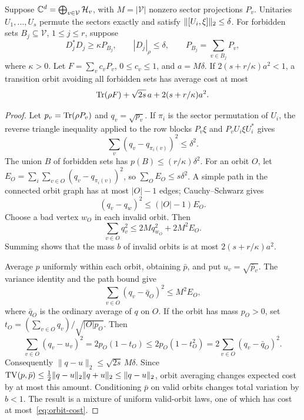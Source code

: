 \begin{theorem}\label{thm:reset-obstruction}
Suppose $\mathbb C^d=\bigoplus_{v\in\mathcal V}\mathcal H_v$, with $M=|\mathcal V|$ nonzero sector projections $P_v$. Unitaries $U_1,\ldots,U_s$ permute the sectors exactly and satisfy $\lVert[U_i,\xi]\rVert_2\le\delta$. For forbidden sets $B_j\subseteq\mathcal V$, $1\le j\le r$, suppose
\[
 D_j^*D_j\ge\kappa P_{B_j},\qquad |D_j|_\rho\le\delta,
 \qquad P_{B_j}=\sum_{v\in B_j}P_v,
\]
where $\kappa>0$. Let $F=\sum_vc_vP_v$, $0\le c_v\le1$, and $a=M\delta$. If $2(s+r/\kappa)a^2<1$, a transition orbit avoiding all forbidden sets has average cost at most
\begin{equation}\label{eq:orbit-cost}
 \operatorname{Tr}(\rho F)+\sqrt{2s}\,a+2(s+r/\kappa)a^2.
\end{equation}
\end{theorem}
\begin{proof}
Let $p_v=\operatorname{Tr}(\rho P_v)$ and $q_v=\sqrt{p_v}$. If $\pi_i$ is the sector permutation of $U_i$, the reverse triangle inequality applied to the row blocks $P_v\xi$ and $P_vU_i\xi U_i^*$ gives
\[
 \sum_v(q_v-q_{\pi_i(v)})^2\le\delta^2.
\]
The union $B$ of forbidden sets has $p(B)\le(r/\kappa)\delta^2$. For an orbit $O$, let
$E_O=\sum_i\sum_{v\in O}(q_v-q_{\pi_i(v)})^2$, so $\sum_OE_O\le s\delta^2$. A simple path in the connected orbit graph has at most $|O|-1$ edges; Cauchy--Schwarz gives
\[
 (q_v-q_w)^2\le(|O|-1)E_O.
\]
Choose a bad vertex $w_O$ in each invalid orbit. Then
\[
 \sum_{v\in O}q_v^2\le2M q_{w_O}^2+2M^2E_O.
\]
Summing shows that the mass $b$ of invalid orbits is at most $2(s+r/\kappa)a^2$.

Average $p$ uniformly within each orbit, obtaining $\bar p$, and put $u_v=\sqrt{\bar p_v}$. The variance identity and the path bound give
\[
 \sum_{v\in O}(q_v-\bar q_O)^2\le M^2E_O,
\]
where $\bar q_O$ is the ordinary average of $q$ on $O$. If the orbit has mass $p_O>0$, set $t_O=(\sum_{v\in O}q_v)/\sqrt{|O|p_O}$. Then
\[
 \sum_{v\in O}(q_v-u_v)^2=2p_O(1-t_O)
 \le2p_O(1-t_O^2)=2\sum_{v\in O}(q_v-\bar q_O)^2.
\]
Consequently $\|q-u\|_2\le\sqrt{2s}\,M\delta$. Since
$\operatorname{TV}(p,\bar p)\le\frac12\|q-u\|_2\|q+u\|_2\le\|q-u\|_2$, orbit averaging changes expected cost by at most this amount. Conditioning $\bar p$ on valid orbits changes total variation by $b<1$. The result is a mixture of uniform valid-orbit laws, one of which has cost at most~\eqref{eq:orbit-cost}.
\end{proof}


